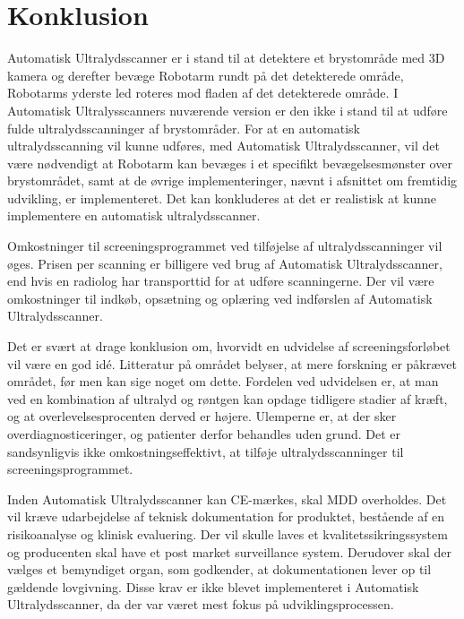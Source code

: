 \chapter{Konklusion}\label{kapitel_Konklusion}
Automatisk Ultralydsscanner er i stand til at detektere et brystområde med 3D kamera og derefter bevæge Robotarm rundt på det detekterede område, Robotarms yderste led roteres mod fladen af det detekterede område. I Automatisk Ultralysscanners nuværende version er den ikke i stand til at udføre fulde ultralydsscanninger af brystområder. For at en automatisk ultralydsscanning vil kunne udføres, med Automatisk Ultralydsscanner, vil det være nødvendigt at Robotarm kan bevæges i et specifikt bevægelsesmønster over brystområdet, samt at de øvrige implementeringer, nævnt i afsnittet om fremtidig udvikling, er implementeret. Det kan konkluderes at det er realistisk at kunne implementere en automatisk ultralydsscanner. 

Omkostninger til screeningsprogrammet ved tilføjelse af ultralydsscanninger vil øges. Prisen per scanning er billigere ved brug af Automatisk Ultralydsscanner, end hvis en radiolog har transporttid for at udføre scanningerne. Der vil være omkostninger til indkøb, opsætning og oplæring ved indførslen af Automatisk Ultralydsscanner.  

Det er svært at drage konklusion om, hvorvidt en udvidelse af screeningsforløbet vil være en god idé. Litteratur på området belyser, at mere forskning er påkrævet området, før men kan sige noget om dette. Fordelen ved udvidelsen er, at man ved en kombination af ultralyd og røntgen kan opdage tidligere stadier af kræft, og at overlevelsesprocenten  derved er højere. Ulemperne er, at der sker overdiagnosticeringer, og patienter derfor behandles uden grund.  Det er sandsynligvis ikke omkostningseffektivt, at tilføje ultralydsscanninger til screeningsprogrammet. 

Inden Automatisk Ultralydsscanner kan CE-mærkes, skal MDD overholdes. Det vil kræve udarbejdelse af teknisk dokumentation for produktet, bestående af en risikoanalyse og klinisk evaluering. Der vil skulle laves et kvalitetssikringssystem og producenten skal have et post market surveillance system. Derudover skal der vælges et bemyndiget organ, som godkender, at dokumentationen lever op til gældende lovgivning. Disse krav er ikke blevet implementeret i Automatisk Ultralydsscanner, da der var været mest fokus på udviklingsprocessen. 